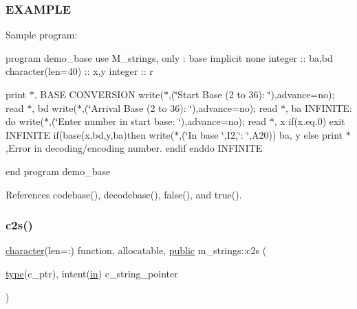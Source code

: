 \subsubsection*{E\+X\+A\+M\+P\+LE}

Sample program\+:

program demo\+\_\+base use M\+\_\+strings, only \+: base implicit none integer \+:\+: ba,bd character(len=40) \+:\+: x,y integer \+:\+: r

print $\ast$,\textquotesingle{} B\+A\+SE C\+O\+N\+V\+E\+R\+S\+I\+ON\textquotesingle{} write($\ast$,\textquotesingle{}(\char`\"{}\+Start   Base (2 to 36)\+: \char`\"{})\textquotesingle{},advance=\textquotesingle{}no\textquotesingle{}); read $\ast$, bd write($\ast$,\textquotesingle{}(\char`\"{}\+Arrival Base (2 to 36)\+: \char`\"{})\textquotesingle{},advance=\textquotesingle{}no\textquotesingle{}); read $\ast$, ba I\+N\+F\+I\+N\+I\+TE\+: do write($\ast$,\textquotesingle{}(\char`\"{}\+Enter number in start base\+: \char`\"{})\textquotesingle{},advance=\textquotesingle{}no\textquotesingle{}); read $\ast$, x if(x.\+eq.\textquotesingle{}0\textquotesingle{}) exit I\+N\+F\+I\+N\+I\+TE if(base(x,bd,y,ba)then write($\ast$,\textquotesingle{}(\char`\"{}\+In base \char`\"{},I2,\char`\"{}\+: \char`\"{},A20)\textquotesingle{}) ba, y else print $\ast$,\textquotesingle{}Error in decoding/encoding number.\textquotesingle{} endif enddo I\+N\+F\+I\+N\+I\+TE

end program demo\+\_\+base 

References codebase(), decodebase(), false(), and true().

\mbox{\label{namespacem__strings_a0a8c0c16a34208351523068686cb743b}} 
\subsubsection{\texorpdfstring{c2s()}{c2s()}}
{\footnotesize\ttfamily \hyperlink{option__stopwatch_83_8txt_abd4b21fbbd175834027b5224bfe97e66}{character}(len=\+:) function, allocatable, \hyperlink{M__stopwatch_83_8txt_a2f74811300c361e53b430611a7d1769f}{public} m\+\_\+strings\+::c2s (\begin{DoxyParamCaption}\item[{\hyperlink{stop__watch_83_8txt_a70f0ead91c32e25323c03265aa302c1c}{type}(c\+\_\+ptr), intent(\hyperlink{M__journal_83_8txt_afce72651d1eed785a2132bee863b2f38}{in})}]{c\+\_\+string\+\_\+pointer }\end{DoxyParamCaption})}



